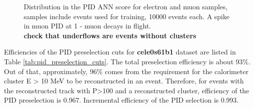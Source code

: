 \begin{figure}[H]
  \caption{
    \label{fig:pid_training_4}
    Distribution in the PID ANN score for electron and muon samples, samples include events used for training,
    10000 events each. A spike in muon PID at 1  - muon decays in flight. \\ 
    {\color{red} \bf check that underflows are events without clusters}
  }
\end{figure}

Efficiencies of the PID preselection cuts for {\bf cele0s61b1} dataset are listed
in Table \ref{tab:pid_preselection_cuts}. The total preselection efficiency is about 93\%.
%
Out of that, approximately, 96\% comes from the requirement for the calorimeter cluster E > 10 MeV to be reconstructed in an event.
Therefore, for events with the reconstructed track with P>100 and a reconstructed cluster, efficiency
of the PID preselection is 0.967. Incremental efficiency of the PID selection is 0.993.

